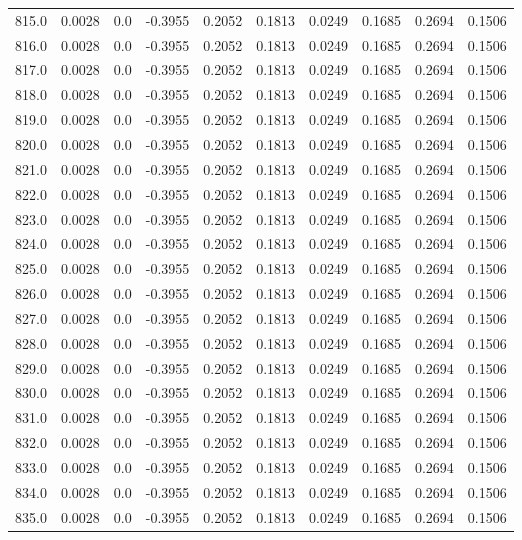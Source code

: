 \begin{longtable}{lrrrrrrrrr}
815.0 & 0.0028 & 0.0 & -0.3955 & 0.2052 & 0.1813 & 0.0249 & 0.1685 & 0.2694 & 0.1506 \\
816.0 & 0.0028 & 0.0 & -0.3955 & 0.2052 & 0.1813 & 0.0249 & 0.1685 & 0.2694 & 0.1506 \\
817.0 & 0.0028 & 0.0 & -0.3955 & 0.2052 & 0.1813 & 0.0249 & 0.1685 & 0.2694 & 0.1506 \\
818.0 & 0.0028 & 0.0 & -0.3955 & 0.2052 & 0.1813 & 0.0249 & 0.1685 & 0.2694 & 0.1506 \\
819.0 & 0.0028 & 0.0 & -0.3955 & 0.2052 & 0.1813 & 0.0249 & 0.1685 & 0.2694 & 0.1506 \\
820.0 & 0.0028 & 0.0 & -0.3955 & 0.2052 & 0.1813 & 0.0249 & 0.1685 & 0.2694 & 0.1506 \\
821.0 & 0.0028 & 0.0 & -0.3955 & 0.2052 & 0.1813 & 0.0249 & 0.1685 & 0.2694 & 0.1506 \\
822.0 & 0.0028 & 0.0 & -0.3955 & 0.2052 & 0.1813 & 0.0249 & 0.1685 & 0.2694 & 0.1506 \\
823.0 & 0.0028 & 0.0 & -0.3955 & 0.2052 & 0.1813 & 0.0249 & 0.1685 & 0.2694 & 0.1506 \\
824.0 & 0.0028 & 0.0 & -0.3955 & 0.2052 & 0.1813 & 0.0249 & 0.1685 & 0.2694 & 0.1506 \\
825.0 & 0.0028 & 0.0 & -0.3955 & 0.2052 & 0.1813 & 0.0249 & 0.1685 & 0.2694 & 0.1506 \\
826.0 & 0.0028 & 0.0 & -0.3955 & 0.2052 & 0.1813 & 0.0249 & 0.1685 & 0.2694 & 0.1506 \\
827.0 & 0.0028 & 0.0 & -0.3955 & 0.2052 & 0.1813 & 0.0249 & 0.1685 & 0.2694 & 0.1506 \\
828.0 & 0.0028 & 0.0 & -0.3955 & 0.2052 & 0.1813 & 0.0249 & 0.1685 & 0.2694 & 0.1506 \\
829.0 & 0.0028 & 0.0 & -0.3955 & 0.2052 & 0.1813 & 0.0249 & 0.1685 & 0.2694 & 0.1506 \\
830.0 & 0.0028 & 0.0 & -0.3955 & 0.2052 & 0.1813 & 0.0249 & 0.1685 & 0.2694 & 0.1506 \\
831.0 & 0.0028 & 0.0 & -0.3955 & 0.2052 & 0.1813 & 0.0249 & 0.1685 & 0.2694 & 0.1506 \\
832.0 & 0.0028 & 0.0 & -0.3955 & 0.2052 & 0.1813 & 0.0249 & 0.1685 & 0.2694 & 0.1506 \\
833.0 & 0.0028 & 0.0 & -0.3955 & 0.2052 & 0.1813 & 0.0249 & 0.1685 & 0.2694 & 0.1506 \\
834.0 & 0.0028 & 0.0 & -0.3955 & 0.2052 & 0.1813 & 0.0249 & 0.1685 & 0.2694 & 0.1506 \\
835.0 & 0.0028 & 0.0 & -0.3955 & 0.2052 & 0.1813 & 0.0249 & 0.1685 & 0.2694 & 0.1506 \\

\end{longtable}
